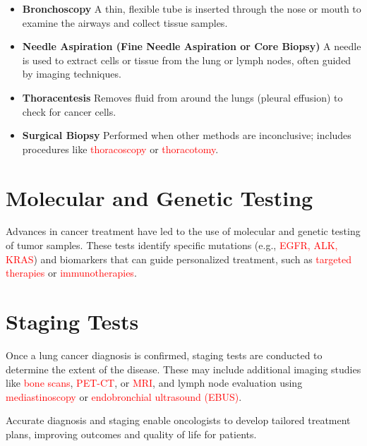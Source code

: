\begin{itemize}
    \item \textbf{Bronchoscopy} A thin, flexible tube is inserted through the nose or mouth to examine the airways and collect tissue samples.
    \item \textbf{Needle Aspiration (Fine Needle Aspiration or Core Biopsy)} A needle is used to extract cells or tissue from the lung or lymph nodes, often guided by imaging techniques.
    \item \textbf{Thoracentesis} Removes fluid from around the lungs (pleural effusion) to check for cancer cells.
    \item \textbf{Surgical Biopsy} Performed when other methods are inconclusive; includes procedures like \textcolor{red}{thoracoscopy} or \textcolor{red}{thoracotomy}.
\end{itemize}

\section{Molecular and Genetic Testing}
Advances in cancer treatment have led to the use of molecular and genetic testing of tumor samples. These tests identify specific mutations (e.g., \textcolor{red}{EGFR, ALK, KRAS}) and biomarkers that can guide personalized treatment, such as \textcolor{red}{targeted therapies} or \textcolor{red}{immunotherapies}.

\section{Staging Tests} 
Once a lung cancer diagnosis is confirmed, staging tests are conducted to determine the extent of the disease. These may include additional imaging studies like \textcolor{red}{bone scans}, \textcolor{red}{PET-CT}, or \textcolor{red}{MRI}, and lymph node evaluation using \textcolor{red}{mediastinoscopy} or \textcolor{red}{endobronchial ultrasound (EBUS)}.

Accurate diagnosis and staging enable oncologists to develop tailored treatment plans, improving outcomes and quality of life for patients.
